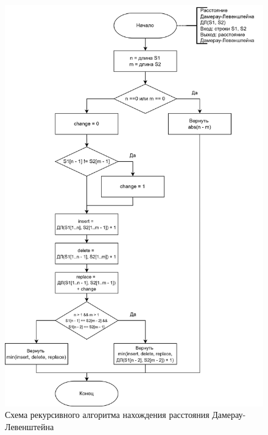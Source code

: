 \documentclass[a4paper,14pt, unknownkeysallowed]{bmstu}
\begin{document}
\begin{figure}[h]
	\centering
	\includegraphics[height=0.8\textheight]{img/dlrec.png}
	\caption{Схема рекурсивного алгоритма нахождения расстояния Дамерау-Левенштейна}
	\label{fig:DLrec}
\end{figure}

\clearpage
\end{document}
